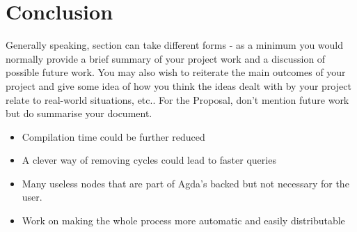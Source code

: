 
\chapter{Conclusion}

Generally speaking, section can take different forms - as a minimum you would
normally provide a brief summary of your project work and a discussion of
possible future work. You may also wish to reiterate the main outcomes of your
project and give some idea of how you think the ideas dealt with by your
project relate to real-world situations, etc.. For the Proposal, don’t mention
future work but do summarise your document.

\begin{itemize}
\item Compilation time could be further reduced 
\item A clever way of removing cycles could lead to faster queries 
\item Many useless nodes that are part of Agda's backed but not necessary for
    the user. 
\item Work on making the whole process more automatic and easily distributable
\end{itemize}
